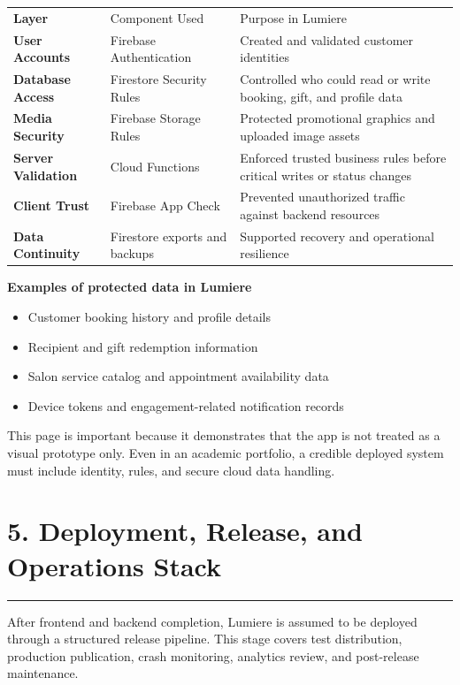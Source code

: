\documentclass[11pt,a4paper]{article}
\newcommand{\PageTitle}[1]{\section*{#1}\vspace{2pt}\textcolor{LumiereGold}{\rule{\textwidth}{1.1pt}}\vspace{6pt}}
\newcommand{\SmallSpace}{\vspace{4pt}}
\begin{document}
\begin{tabularx}{\textwidth}{>{\bfseries}p{2.0cm} p{3.1cm} Y}
\color{white}Layer & \color{white}Component Used & \color{white}Purpose in Lumiere \\
User Accounts & Firebase Authentication & Created and validated customer identities \\
Database Access & Firestore Security Rules & Controlled who could read or write booking, gift, and profile data \\
Media Security & Firebase Storage Rules & Protected promotional graphics and uploaded image assets \\
Server Validation & Cloud Functions & Enforced trusted business rules before critical writes or status changes \\
Client Trust & Firebase App Check & Prevented unauthorized traffic against backend resources \\
Data Continuity & Firestore exports and backups & Supported recovery and operational resilience \\
\end{tabularx}

\SmallSpace
\begin{tcolorbox}[colback=LumiereCream,colframe=LumiereLine,boxrule=0.6pt,arc=2mm]
\textbf{\textcolor{LumiereDark}{Examples of protected data in Lumiere}}
\begin{itemize}
\item Customer booking history and profile details
\item Recipient and gift redemption information
\item Salon service catalog and appointment availability data
\item Device tokens and engagement-related notification records
\end{itemize}
\end{tcolorbox}

This page is important because it demonstrates that the app is not treated as a visual prototype only. Even in an academic portfolio, a credible deployed system must include identity, rules, and secure cloud data handling.

\newpage
\PageTitle{5. Deployment, Release, and Operations Stack}

After frontend and backend completion, Lumiere is assumed to be deployed through a structured release pipeline. This stage covers test distribution, production publication, crash monitoring, analytics review, and post-release maintenance.
\end{document}
